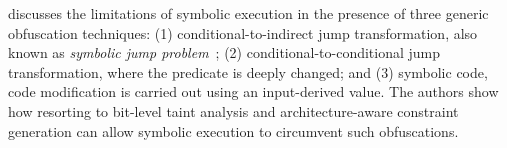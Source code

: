 \cite{YD-CCS15} discusses the limitations of symbolic execution in the presence of three generic obfuscation techniques: (1) conditional-to-indirect jump transformation, also known as {\em symbolic jump problem}~\cite{SAB-SP10}; (2) conditional-to-conditional jump transformation, where the predicate is deeply changed; and (3) symbolic code,  code modification is carried out using an input-derived value. The authors show how resorting to bit-level taint analysis and architecture-aware constraint generation can allow symbolic execution to circumvent such obfuscations.